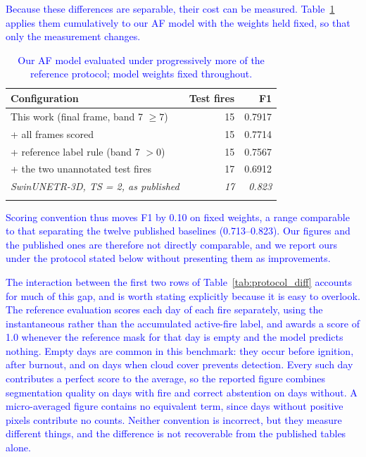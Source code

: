 \documentclass[sensors,article,submit,moreauthors,pdftex]{Definitions/mdpi}
\newcommand{\rev}[1]{\textcolor{blue}{#1}}
\begin{document}
\rev{Because these differences are separable, their cost can be measured.
Table~\ref{tab:protocol_decomp} applies them cumulatively to our AF model with
the weights held fixed, so that only the measurement changes.}

\begin{table}[H]
\centering
\caption{\rev{Our AF model evaluated under progressively more of the reference
protocol; model weights fixed throughout.}}
\label{tab:protocol_decomp}
\renewcommand{\arraystretch}{1.2}
\begin{tabular}{@{}lrr@{}}
\arrayrulecolor{hdrblue}
\toprule
\rowcolor{hdrblue}
\color{white}\textbf{Configuration} &
\color{white}\textbf{Test fires} &
\color{white}\textbf{F1} \\
\midrule
\rowcolor{rowA} This work (final frame, band 7 $\geq 7$) & 15 & 0.7917 \\
\rowcolor{white} \quad + all frames scored & 15 & 0.7714 \\
\rowcolor{rowA} \quad + reference label rule (band 7 $> 0$) & 15 & 0.7567 \\
\rowcolor{white} \quad + the two unannotated test fires & 17 & 0.6912 \\
\midrule
\rowcolor{rowA} \textit{SwinUNETR-3D, TS = 2, as published} & \textit{17} & \textit{0.823} \\
\arrayrulecolor{hdrblue}\bottomrule
\end{tabular}
\end{table}

\rev{Scoring convention thus moves F1 by 0.10 on fixed weights, a range
comparable to that separating the twelve published baselines (0.713--0.823). Our
figures and the published ones are therefore not directly comparable, and we
report ours under the protocol stated below without presenting them as
improvements.}

\rev{The interaction between the first two rows of
Table~\ref{tab:protocol_diff} accounts for much of this gap, and is worth
stating explicitly because it is easy to overlook. The reference evaluation
scores each day of each fire separately, using the instantaneous rather than the
accumulated active-fire label, and awards a score of 1.0 whenever the reference
mask for that day is empty and the model predicts nothing. Empty days are common
in this benchmark: they occur before ignition, after burnout, and on days when
cloud cover prevents detection. Every such day contributes a perfect score to
the average, so the reported figure combines segmentation quality on days with
fire and correct abstention on days without. A micro-averaged figure contains no
equivalent term, since days without positive pixels contribute no counts.
Neither convention is incorrect, but they measure different things, and the
difference is not recoverable from the published tables alone.}
\end{document}
